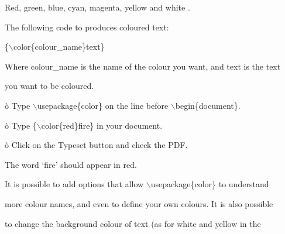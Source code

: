 \documentclass[a4paper,portrait,12pt]{article}
\begin{document}
\begin{flushleft}
Red, green, blue, cyan, magenta, yellow and white .
\end{flushleft}


\begin{flushleft}
The following code to produces coloured text:
\end{flushleft}


\begin{flushleft}
\{\ensuremath{\backslash}color\{colour\_name\}text\}
\end{flushleft}


\begin{flushleft}
Where colour\_name is the name of the colour you want, and text is the text
\end{flushleft}


\begin{flushleft}
you want to be coloured.
\end{flushleft}


\begin{flushleft}
\`{o} Type \ensuremath{\backslash}usepackage\{color\} on the line before \ensuremath{\backslash}begin\{document\}.
\end{flushleft}


\begin{flushleft}
\`{o} Type \{\ensuremath{\backslash}color\{red\}fire\} in your document.
\end{flushleft}


\begin{flushleft}
\`{o} Click on the Typeset button and check the PDF.
\end{flushleft}


\begin{flushleft}
The word {`}fire' should appear in red.
\end{flushleft}


\begin{flushleft}
It is possible to add options that allow \ensuremath{\backslash}usepackage\{color\} to understand
\end{flushleft}


\begin{flushleft}
more colour names, and even to define your own colours. It is also possible
\end{flushleft}


\begin{flushleft}
to change the background colour of text (as for white and yellow in the
\end{flushleft}
\end{document}
